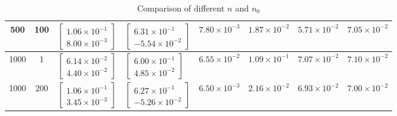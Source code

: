 \documentclass{article}
\begin{document}
\begin{table}[h!]
\begin{center}
\begin{tabular}{|c|c|m{3.0cm}|m{3.0cm}|m{1.7cm}|m{1.7cm}|c|c|}
			\hline
			500 & 100 & $\begin{bmatrix}1.06\times 10^{-1} \\ 8.00\times 10^{-3}\end{bmatrix}$ & $\begin{bmatrix}6.31\times 10^{-1} \\ -5.54\times 10^{-2}\end{bmatrix}$ & $7.80\times 10^{-3}$ & $1.87\times 10^{-2}$ & $5.71\times 10^{-2}$ & $7.05\times 10^{-2}$\\ 
			\hline
			1000 & 1 & $\begin{bmatrix}6.14\times 10^{-2} \\ 4.40\times 10^{-2}\end{bmatrix}$ & $\begin{bmatrix}6.00\times 10^{-1} \\ 4.85\times 10^{-2}\end{bmatrix}$ & $6.55\times 10^{-2}$ & $1.09\times 10^{-1}$ & $7.07\times 10^{-2}$ & $7.10\times 10^{-2}$\\ 
			\hline
			1000 & 200 & $\begin{bmatrix}1.06\times 10^{-1} \\ 3.45\times 10^{-3}\end{bmatrix}$ & $\begin{bmatrix}6.27\times 10^{-1} \\ -5.26\times 10^{-2}\end{bmatrix}$ & $6.50\times 10^{-3}$ & $2.16\times 10^{-2}$ & $6.93\times 10^{-2}$ & $7.00\times 10^{-2}$\\
			\hline
		\end{tabular}
	\end{center}
	\caption{Comparison of different $n$ and $n_0$}
	\label{table:3}
\end{table}
\end{document}
